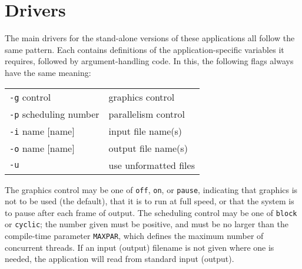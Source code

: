 \section{Drivers\label{s:main}}

The main drivers for the stand-alone versions of these applications
all follow the same pattern.
Each contains definitions of the application-specific variables it requires,
followed by argument-handling code.
In this,
the following flags always have the same meaning:
\begin{small}\begin{center}\begin{tabular}{ll}
{\tt{-g}} control		& graphics control	\\
{\tt{-p}} scheduling number	& parallelism control	\\
{\tt{-i}} name [name]		& input file name(s)	\\
{\tt{-o}} name [name]		& output file name(s)	\\
{\tt{-u}} 			& use unformatted files
\end{tabular}\end{center}\end{small}
The graphics control may be one of {\tt{off}}, {\tt{on}}, or {\tt{pause}},
indicating that graphics is not to be used (the default),
that it is to run at full speed,
or that the system is to pause after each frame of output.
The scheduling control may be one of {\tt{block}} or {\tt{cyclic}};
the number given must be positive,
and must be no larger than the compile-time parameter {\tt{MAXPAR}},
which defines the maximum number of concurrent threads.
If an input (output) filename is not given where one is needed,
the application will read from standard input (output).

